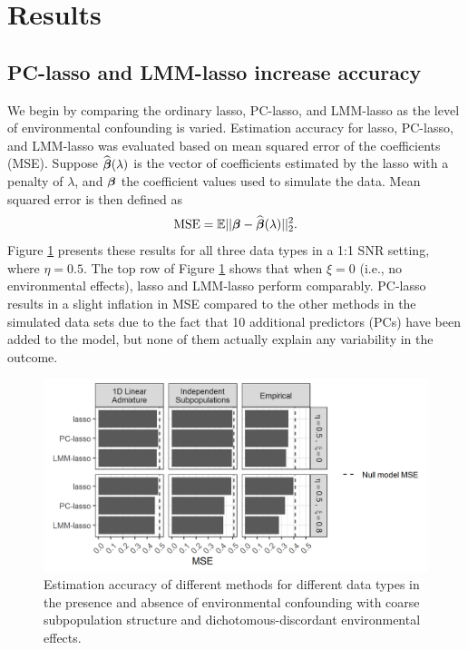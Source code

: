 \section{Results} \label{sec:results}

\subsection{PC-lasso and LMM-lasso increase accuracy}
\label{sec:sim-mse}

We begin by comparing the ordinary lasso, PC-lasso, and LMM-lasso as the level of environmental confounding is varied. Estimation accuracy for lasso, PC-lasso, and LMM-lasso was evaluated based on mean squared error of the coefficients (MSE). Suppose $\widehat{\boldsymbol{\beta}{}}(\lambda)$ is the vector of coefficients estimated by the lasso with a penalty of $\lambda$, and $\boldsymbol{\beta}{}$ the coefficient values used to simulate the data. Mean squared error is then defined as
\begin{equation}
    \text{MSE} = \mathbb{E}||\boldsymbol{\beta}{} - \widehat{\boldsymbol{\beta}{}}(\lambda)||^2_2.
\end{equation}
Figure \ref{fig:mse} presents these results for all three data types in a 1:1 SNR setting, where $\eta = 0.5$. The top row of Figure \ref{fig:mse} shows that when $\xi = 0$ (i.e., no environmental effects), lasso and LMM-lasso perform comparably. PC-lasso results in a slight inflation in MSE compared to the other methods in the simulated data sets due to the fact that 10 additional predictors (PCs) have been added to the model, but none of them actually explain any variability in the outcome. 

\begin{figure}[H]
    \centering
    \includegraphics[width = \textwidth]{figures/beta_mse.png}
    \caption{Estimation accuracy of different methods for different data types in the presence and absence of environmental confounding with coarse subpopulation structure and dichotomous-discordant environmental effects.}
    \label{fig:mse}
\end{figure}

